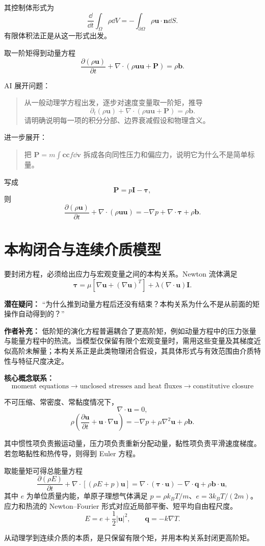 其控制体形式为
\[
\frac{\dd}{\dd t}\int_\Omega \rho\dd V
=
-\int_{\partial\Omega}\rho\bm u\cdot\bm n\dd S.
\]
有限体积法正是从这一形式出发。

取一阶矩得到动量方程
\[
\frac{\partial(\rho\bm u)}{\partial t}
+
\nabla\cdot(\rho\bm u\bm u+\bm P)
=
\rho\bm b.
\]

\begin{askai}
AI 展开问题：
\begin{quote}
从一般动理学方程出发，逐步对速度变量取一阶矩，推导
\[
\partial_t(\rho\bm u)+\nabla\cdot(\rho\bm u\bm u+\bm P)=\rho\bm b.
\]
请明确说明每一项的积分分部、边界衰减假设和物理含义。
\end{quote}

进一步展开：
\begin{quote}
把 \(\bm P=m\int \bm c\bm c f\dd\bm v\) 拆成各向同性压力和偏应力，说明它为什么不是简单标量。
\end{quote}
\end{askai}

写成
\[
\bm P=p\bm I-\bm\tau,
\]
则
\[
\frac{\partial(\rho\bm u)}{\partial t}
+
\nabla\cdot(\rho\bm u\bm u)
=
-\nabla p+\nabla\cdot\bm\tau+\rho\bm b.
\]

\section{本构闭合与连续介质模型}
要封闭方程，必须给出应力与宏观变量之间的本构关系。Newton 流体满足
\[
\bm\tau
=
\mu\left[\nabla\bm u+(\nabla\bm u)^T\right]
+\lambda(\nabla\cdot\bm u)\bm I.
\]

\begin{authornote}
\textbf{潜在疑问：}
“为什么推到动量方程后还没有结束？本构关系为什么不是从前面的矩操作自动得到的？”

\textbf{作者补充：}
低阶矩的演化方程普遍耦合了更高阶矩，例如动量方程中的压力张量与能量方程中的热流。当模型仅保留有限个宏观变量时，需用这些变量及其梯度近似高阶未解量；本构关系正是此类物理闭合假设，其具体形式与有效范围由介质特性与特征尺度决定。

\textbf{核心概念联系：}
\[
\text{moment equations}
\longrightarrow
\text{unclosed stresses and heat fluxes}
\longrightarrow
\text{constitutive closure}
\]
\end{authornote}


不可压缩、常密度、常黏度情况下，
\[
\nabla\cdot\bm u=0,
\]
\[
\rho\left(
\frac{\partial\bm u}{\partial t}
+\bm u\cdot\nabla\bm u
\right)
=
-\nabla p+\mu\nabla^2\bm u+\rho\bm b.
\]

其中惯性项负责搬运动量，压力项负责重新分配动量，黏性项负责平滑速度梯度。若忽略黏性和热传导，则得到 Euler 方程。

取能量矩可得总能量方程
\[
\frac{\partial(\rho E)}{\partial t}
+
\nabla\cdot[(\rho E+p)\bm u]
=
\nabla\cdot(\bm\tau\cdot\bm u)
-\nabla\cdot\bm q
+\rho\bm b\cdot\bm u,
\]
其中 $e$ 为单位质量内能，单原子理想气体满足 $p=\rho k_BT/m$、$e=3k_BT/(2m)$。应力和热流的 Newton--Fourier 形式对应近局部平衡、短平均自由程尺度。
\[
E=e+\frac12|\bm u|^2,
\qquad
\bm q=-k\nabla T.
\]

从动理学到连续介质的本质，是只保留有限个矩，并用本构关系封闭更高阶矩。
